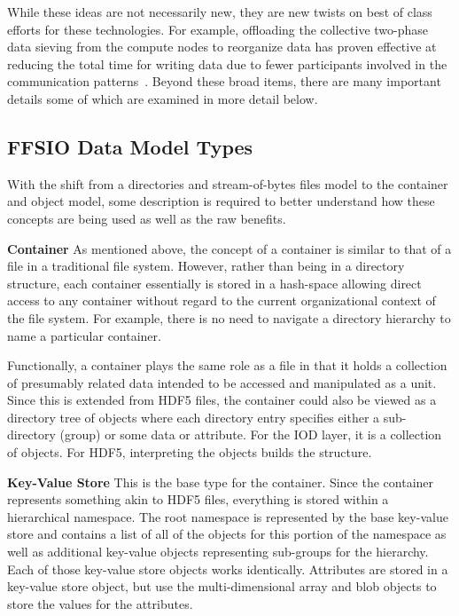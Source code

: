 \documentclass[conference]{IEEEtran} \pdfpagewidth=8.5in
\begin{document}
While these ideas are not necessarily new, they are new twists on best of class
efforts for these technologies. For example, offloading the collective
two-phase data sieving from the compute nodes to reorganize data has proven
effective at reducing the total time for writing data due to fewer participants
involved in the communication patterns~\cite{lofstead:2011:nessie-staging}.
Beyond these broad items, there are many important details some of which are
examined in more detail below.

\subsection{FFSIO Data Model Types}
\label{sec:data-model}

With the shift from a directories and stream-of-bytes files model to the
container and object model, some description is required to better understand
how these concepts are being used as well as the raw benefits.

\textbf{Container}
As mentioned above, the concept of a container is similar to that of a file in
a traditional file system. However, rather than being in a directory structure,
each container essentially is stored in a hash-space allowing direct access to
any container without regard to the current organizational context of the file
system.  For example, there is no need to navigate a directory hierarchy to
name a particular container.

Functionally, a container plays the same role as a file in that it holds a
collection of presumably related data intended to be accessed and manipulated
as a unit.  Since this is extended from HDF5 files, the container could also be
viewed as a directory tree of objects where each directory entry specifies
either a sub-directory (group) or some data or attribute. For the IOD layer, it
is a collection of objects. For HDF5, interpreting the objects builds the
structure.

\textbf{Key-Value Store}
This is the base type for the container. Since the container represents
something akin to HDF5 files, everything is stored within a hierarchical
namespace. The root namespace is represented by the base key-value store and
contains a list of all of the objects for this portion of the namespace as well
as additional key-value objects representing sub-groups for the hierarchy. Each
of those key-value store objects works identically.  Attributes are stored in a
key-value store object, but use the multi-dimensional array and blob objects to
store the values for the attributes.
\end{document}
